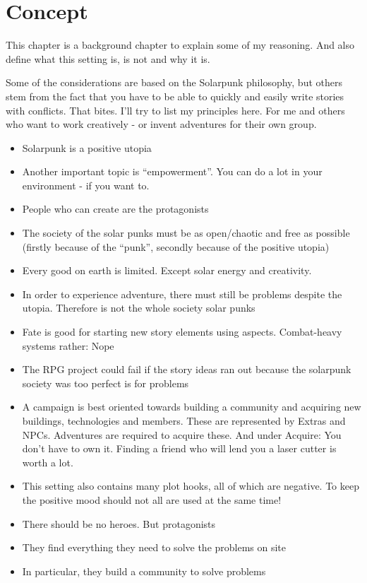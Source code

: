 \chapter{Concept}

This chapter is a background chapter to explain some of my reasoning. And also define what this setting is, is not and why it is.

Some of the considerations are based on the Solarpunk philosophy, but others stem from the fact that
you have to be able to quickly and easily write stories with conflicts. That bites. I'll try to list my principles here. For me and others who want to work creatively - or invent adventures for their own group.

\begin{itemize}
\item Solarpunk is a positive utopia
\item Another important topic is “empowerment”. You can do a lot in your environment - if you want to.
\item People who can create are the protagonists
\item The society of the solar punks must be as open/chaotic and free as possible (firstly because of the “punk”, secondly
because of the positive utopia)
\item Every good on earth is limited. Except solar energy and creativity.
\item In order to experience adventure, there must still be problems despite the utopia. Therefore is not the whole society
solar punks
\item Fate is good for starting new story elements using aspects. Combat-heavy systems rather: Nope
\item The RPG project could fail if the story ideas ran out because the solarpunk society was too perfect
is for problems
\item A campaign is best oriented towards building a community and acquiring new buildings, technologies and
members. These are represented by Extras and NPCs. Adventures are required to acquire these. And under
Acquire: You don't have to own it. Finding a friend who will lend you a laser cutter is worth a lot.
\item This setting also contains many plot hooks, all of which are negative. To keep the positive mood should
not all are used at the same time!
\item There should be no heroes. But protagonists
\item They find everything they need to solve the problems on site
\item In particular, they build a community to solve problems
\end{itemize}


